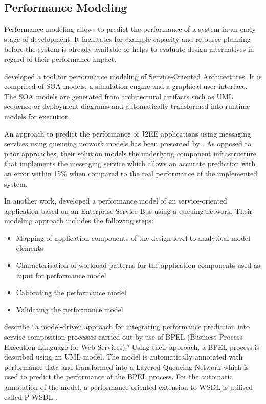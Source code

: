 \subsection{Performance Modeling}
Performance modeling allows to predict the performance of a system in an early stage of development. It facilitates for example capacity and resource planning before the system is already available or helps to evaluate design alternatives in regard of their performance impact.

\citet{Brebner:2008uq} developed a tool for performance modeling of Service-Oriented Architectures. It is comprised of SOA models, a simulation engine and a graphical user interface. The SOA models are generated from architectural artifacts such as UML sequence or deployment diagrams and automatically transformed into runtime models for execution.

An approach to predict the performance of J2EE applications using messaging services using queueing network models has been presented by \citet{Liu:2007vn}. As opposed to prior approaches, their solution models the underlying component infrastructure that implements the messaging service which allows an accurate prediction with an error within 15\% when compared to the real performance of the implemented system.

In another work, \citet{Liu:2007vn} developed a performance model of an service-oriented application based on an Enterprise Service Bus using a queuing network. Their modeling approach includes the following steps:
\begin{itemize}
	\item Mapping of application components of the design level to analytical model elements
	\item Characterisation of workload patterns for the application components used as input for performance model
	\item Calibrating the performance model
	\item Validating the performance model
\end{itemize}

\citet{DAmbrogio:2007ly} describe ``a model-driven approach for integrating performance prediction into service composition processes carried out by use of BPEL (Business Process Execution Language for Web Services).'' Using their approach, a BPEL process is described using an UML model. The model is automatically annotated with performance data and transformed into a Layered Queueing Network which is used to predict the performance of the BPEL process. For the automatic annotation of the model, a performance-oriented extension to WSDL is utilised called P-WSDL \citep{D-Ambrogio:2005ve}.

